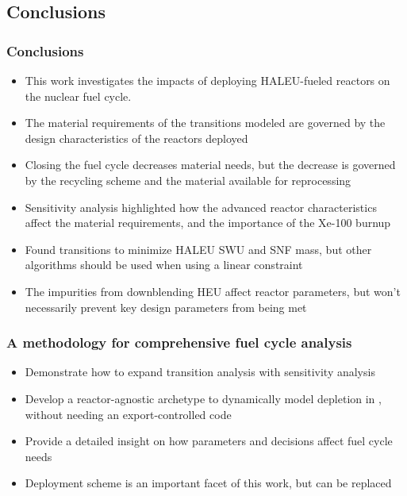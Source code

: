 \subsection{Conclusions}
\begin{frame}
      \frametitle{Conclusions}
      \begin{itemize}
        \item This work investigates the impacts of deploying \gls{HALEU}-fueled 
              reactors on the nuclear fuel cycle.
        \item<2-> The material requirements of the transitions modeled are governed 
              by the design characteristics of the reactors deployed
        \item<2-> Closing the fuel cycle decreases material needs, but the 
              decrease is governed by the recycling scheme and the 
              material available for reprocessing
        \item<3-> Sensitivity analysis highlighted how the 
              advanced reactor characteristics affect the material requirements, and 
              the importance of the Xe-100 burnup
        \item<3-> Found transitions to minimize \gls{HALEU} \gls{SWU} 
              and \gls{SNF} mass, but other algorithms should 
              be used when using a linear constraint
        \item<4-> The impurities from downblending \gls{HEU} affect 
              reactor parameters, but won't necessarily prevent key design 
              parameters from being met
      \end{itemize}
\end{frame}

\begin{frame}
      \frametitle{A methodology for comprehensive fuel cycle analysis}
      \begin{itemize}
            \item Demonstrate how to expand transition analysis with 
                  sensitivity analysis
            \item Develop a reactor-agnostic archetype to dynamically model depletion 
                  in \Cyclus, without needing an export-controlled code
            \item<2-> Provide a detailed insight on how parameters and 
                  decisions affect fuel cycle needs
            \item<3-> Deployment scheme is an important facet of this work, but 
                 can be replaced
      \end{itemize}
\end{frame}

